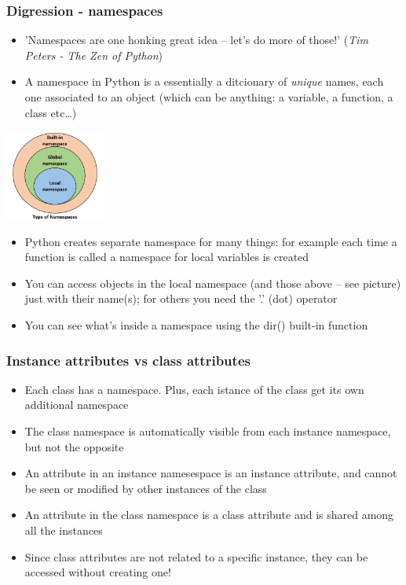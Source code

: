 \documentclass[9pt]{beamer}
\begin{document}
\begin{frame}
  \frametitle{Digression - namespaces}
  
  \begin{itemize}
    \small
    \item 'Namespaces are one honking great idea -- let's do more of those!'
            (\emph{Tim Peters - The Zen of Python})
    \medskip
    \item A \alert{namespace} in Python is a essentially a ditcionary of \emph{unique} names, each one
          associated to an object (which can be anything: a variable, a function, a class etc\dots)
    \medskip
  \end{itemize}
  
  \centering\includegraphics[width=0.25\textwidth]{types_namespace.png}
  
  \begin{itemize}
    \small
    \item Python creates separate namespace for many things: for example each time a function is
          called a namespace for local variables is created
    \medskip 
    \item You can access objects in the local namespace (and those above -- see picture) just with their name(s);
          for others you need  the '.' (dot) operator
    \medskip
    \item You can see what's inside a namespace using the dir() built-in function
  \end{itemize}
  
\end{frame}


\begin{frame}
  \frametitle{Instance attributes vs class attributes}
  
  \begin{itemize}
    \small
    \item Each class has a namespace. Plus, each istance of the class get its own additional namespace
    \medskip
    \item The class namespace is automatically visible from each instance namespace, but not the opposite
    \medskip
    \item An attribute in an instance namesespace is an \alert{instance attribute}, and cannot be seen or modified
          by other instances of the class
    \medskip
    \item An attribute in the class namespace is a \alert{class attribute} and is shared among all the instances
    \medskip
    \item Since class attributes are not related to a specific instance, they can be accessed without creating one!
  \end{itemize}
  
\end{frame}
\end{document}
